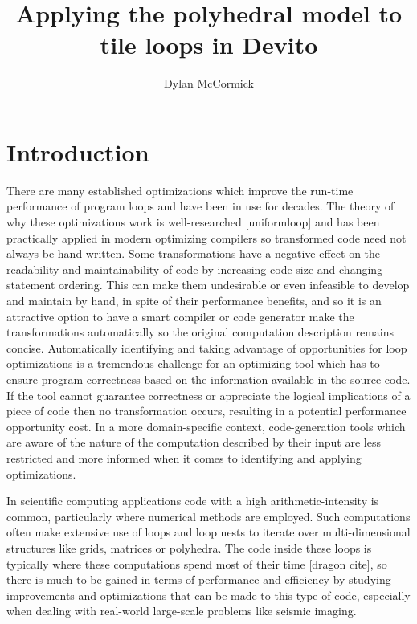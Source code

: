 \documentclass[a4paper,12pt,twoside]{report}
\title{Applying the polyhedral model to tile loops in Devito}
\author{Dylan McCormick}
\begin{document}
\maketitle

\tableofcontents

\begin{abstract}
\end{abstract}

\chapter{Introduction}
There are many established optimizations which improve the run-time performance of program loops and have been in use for decades.
The theory of why these optimizations work is well-researched [uniformloop] and has been practically applied in modern optimizing compilers so
transformed code need not always be hand-written. Some transformations have a negative effect on the readability and maintainability of code by
increasing code size and changing statement ordering. This can make them undesirable or even infeasible to develop and maintain by hand, in spite
of their performance benefits, and so it is an attractive option to have a smart compiler or code generator make the transformations automatically so the
original computation description remains concise. Automatically identifying and taking advantage of opportunities for loop optimizations is a tremendous
challenge for an optimizing tool which has to ensure program correctness based on the information available in the source code. If the tool cannot guarantee
correctness or appreciate the logical implications of a piece of code then no transformation occurs, resulting in a potential performance opportunity cost.
In a more domain-specific context, code-generation tools which are aware of the nature of the computation described by their input are less
restricted and more informed when it comes to identifying and applying optimizations.

In scientific computing applications code with a high arithmetic-intensity is common, particularly where numerical methods are employed.
Such computations often make extensive use of loops and loop nests to iterate over multi-dimensional structures like grids, matrices or
polyhedra. The code inside these loops is typically where these computations spend most of their time [dragon cite], so there is much to be gained
in terms of performance and efficiency by studying improvements and optimizations that can be made to this type of code, especially when dealing
with real-world large-scale problems like seismic imaging.
\end{document}
